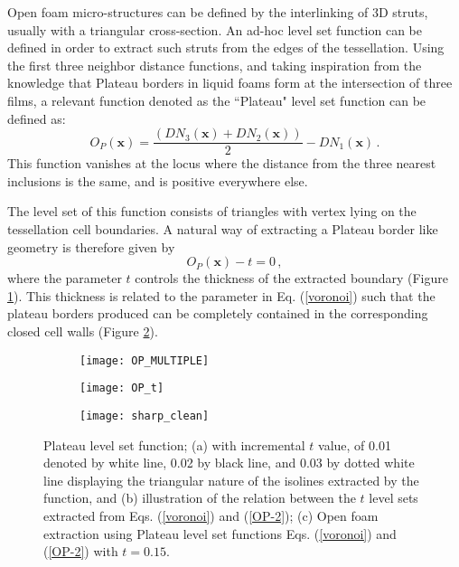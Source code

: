 Open foam micro-structures can be defined by the interlinking of 3D struts, usually with a triangular cross-section. An ad-hoc level set function can be defined in order to extract such struts from the edges of the tessellation. Using the first three neighbor distance functions, and taking inspiration from the knowledge that Plateau borders in liquid foams form at the intersection of three films, a relevant function denoted as the ``Plateau" level set function can be defined as\cite{sononAdvancedApproachGeneration2015}:
\begin{equation}
O_P(\textbf{x})=\frac{(DN_3(\textbf{x})+DN_2(\textbf{x}))}{2}-DN_1(\textbf{x})\,.\label{OP}
\end{equation}
This function vanishes at the locus where the distance from the three nearest inclusions is the same, and is positive everywhere else.

The level set of this function consists of triangles with vertex lying on the tessellation cell boundaries. A natural way of extracting a Plateau border like geometry is therefore given by
\begin{equation}
O_P(\textbf{x})-t=0\,,\label{OP-2}
\end{equation}
where the parameter $ t $ controls the thickness of the extracted boundary (Figure \ref{plateau11}). This thickness is related to the parameter in Eq. (\ref{voronoi}) such that the plateau borders produced can be completely contained in the corresponding closed cell walls (Figure \ref{plateau1}). 

\begin{figure}
	\centering
	\begin{subfigure}[b]{0.33\textwidth}
		\texttt{[image: OP\_MULTIPLE]}
		\caption{}\label{plateau11}
	\end{subfigure}
	\begin{subfigure}[b]{0.3\textwidth}
		\texttt{[image: OP\_t]}
		\caption{}\label{plateau1}
	\end{subfigure}
	\begin{subfigure}[b]{0.32\textwidth}	\texttt{[image: sharp\_clean]}
		\caption{}\label{plateau2}
	\end{subfigure}
	\caption{Plateau level set function; (a) with incremental $ t $ value, of 0.01 denoted by white line, 0.02 by black line, and 0.03 by dotted white line displaying the triangular nature of the isolines extracted by the function, and (b) illustration of the relation between the $ t $ level sets extracted from Eqs. (\ref{voronoi}) and (\ref{OP-2}); (c) Open foam extraction using Plateau level set functions  Eqs. (\ref{voronoi}) and (\ref{OP-2}) with $ t=0.15 $.}
\end{figure}

